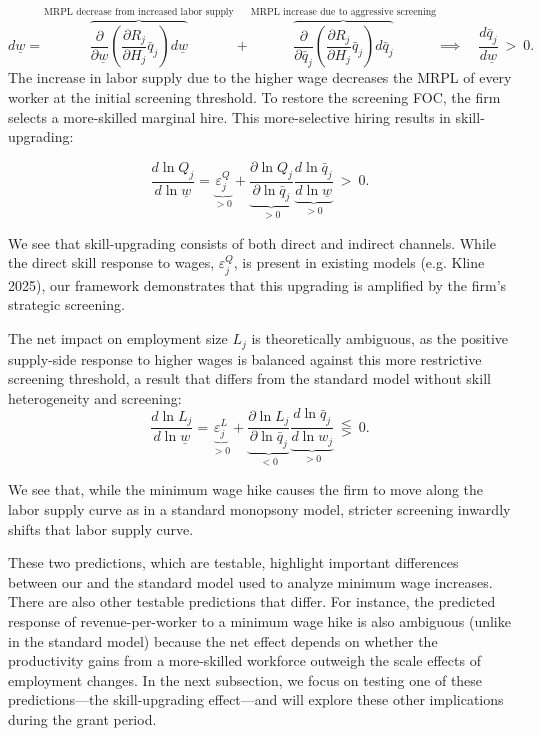 \documentclass[11pt]{article}
\begin{document}
\vspace{-0.4cm}
\[ d \underline{w}   = \overbrace{\frac{\partial}{\partial \underline{w}}\left( \frac{\partial R_j}{\partial H_j}\bar{q}_j\right)d\underline{w}}^{\text{MRPL decrease from increased labor supply}} + \overbrace{\frac{\partial}{\partial\bar{q}_j}\left( \frac{\partial R_j}{\partial H_j}\bar{q}_j \right)d\bar{q}_j}^{\text{MRPL increase due to aggressive screening}}
\implies \quad
\frac{d\bar{q}_j}{d\underline{w}}  ~>~ 0. \] 
The increase in labor supply due to the higher wage decreases the MRPL of every worker at the initial screening threshold. To restore the screening FOC, the firm selects a more-skilled marginal hire. This more-selective hiring results in skill-upgrading:

$$ \frac{d\ln Q_j}{d\ln\underline{w}} = \underbrace{\varepsilon_j^Q}_{>0} + \underbrace{\frac{\partial \ln Q_j}{\partial \ln \bar{q}_j}}_{>0} \underbrace{\frac{d\ln \bar{q}_j}{d\ln\underline{w}}}_{>0} ~>~ 0. $$

\vspace{-0.15cm}
\noindent
We see that skill-upgrading consists of both direct and indirect channels. While the direct skill response to wages, $\varepsilon_j^Q$, is present in existing models (e.g. Kline 2025), our framework demonstrates that this upgrading is amplified by the firm’s strategic screening. 

The net impact on employment size $L_j$ is theoretically ambiguous, as the positive supply-side response to higher wages is balanced against this more restrictive screening threshold, a result that differs from the standard model without skill heterogeneity and screening: 
$$ \frac{d\ln L_j}{d\ln\underline{w}} = \underbrace{\varepsilon_j^L}_{>0} + \underbrace{\frac{\partial \ln L_j}{\partial \ln \bar{q}_j}}_{<0} \underbrace{\frac{d\ln \bar{q}_j}{d\ln w_j}}_{>0} ~\lesseqgtr~ 0. $$

\vspace{-0.15cm}
\noindent
We see that, while the minimum wage hike causes the firm to move along the labor supply curve as in a standard monopsony model, stricter screening inwardly shifts that labor supply curve. 

These two predictions, which are testable, highlight important differences between our and the standard model used to analyze minimum wage increases. There are also other testable predictions that differ. For instance, the predicted response of revenue-per-worker to a minimum wage hike is also ambiguous (unlike in the standard model) because the net effect depends on whether the productivity gains from a more-skilled workforce outweigh the scale effects of employment changes. In the next subsection, we focus on testing one of these predictions---the skill-upgrading effect---and will explore these other implications during the grant period.
\end{document}
